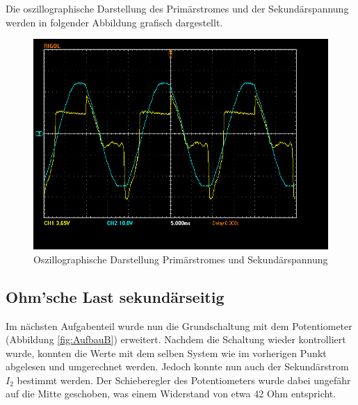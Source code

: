 \documentclass[12pt,a4paper,twoside]{article}
\begin{document}
\begin{table}[H]
    \centering
    \caption{Messwerte Leerlauf}
    \label{tab:messwerteLeerlauf}
\end{table}

\noindent
Die oszillographische Darstellung des Primärstromes und der Sekundärspannung werden in folgender Abbildung grafisch dargestellt.

\begin{figure}[H]
    \centering
    \includegraphics[width=0.6\linewidth, angle=0]{nudes/A1 Oszi.jpg}
    \caption{Oszillographische Darstellung Primärstromes und Sekundärspannung}
    \label{fig:OszilloskopA}
\end{figure}


\subsection{Ohm'sche Last sekundärseitig}

Im nächsten Aufgabenteil wurde nun die Grundschaltung mit dem Potentiometer (Abbildung \ref{fig:AufbauB}) erweitert. Nachdem die Schaltung wieder kontrolliert wurde, konnten die Werte mit dem selben System wie im vorherigen Punkt abgelesen und umgerechnet werden.
Jedoch konnte nun auch der Sekundärstrom $I_{2}$ bestimmt werden. Der Schieberegler des Potentiometers wurde dabei ungefähr auf die Mitte geschoben, was einem Widerstand von etwa 42 Ohm entspricht.

\begin{table}[H]
    \centering
    \caption{Messwerte Ohm'sche Last}
    \label{tab:messwerteOhm}
\end{table}
\end{document}
